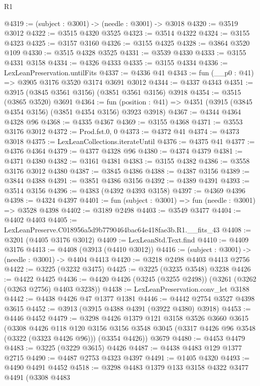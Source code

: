 \begin{lexlean}{R1}
\begin{coremodule}
@4319 := (subject : @3001) -> (needle : @3001) -> @3018
@4320 := @3519 @3012
@4322 := @3515 @4320 @3525
@4323 := @3514 @4322
@4324 := @3155 @4323
@4325 := @3157 @3160
@4326 := @3155 @4325
@4328 := @3864 @3520 @109
@4330 := @3515 @4328 @3525
@4331 := @3539 @4330
@4333 := @3155 @4331 @3158
@4334 := @4326 @4333
@4335 := @3155 @4334
@4336 := LexLeanPreservation.untilFits
@4337 := @4336 @41
@4343 := fun (__p0 : @41) => @3905 @3176 @3520 @3174 @3691 @3012
@4344 := @4337 @4343
@4351 := @3915 (@3845 @3561 @3156) (@3851 @3561 @3156) @3918
@4354 := @3515 (@3865 @3520) @3691
@4364 := fun (position : @41) => @4351 (@3915 (@3845 @4354 @3156) (@3851 @4354 @3156) @3923 @3918)
@4367 := @4344 @4364 @4328 @96
@4368 := @4335 @4367
@4369 := @3155 @4368
@4371 := @3553 @3176 @3012
@4372 := Prod.fst.{0, 0}
@4373 := @4372 @41
@4374 := @4373 @3018
@4375 := LexLeanCollections.iterateUntil
@4376 := @4375 @41
@4377 := @4376 @4364
@4379 := @4377 @4328 @96
@4380 := @4374 @4379
@4381 := @4371 @4380
@4382 := @3161 @4381
@4383 := @3155 @4382
@4386 := @3558 @3176 @3012 @4380
@4387 := @3845 @4386
@4388 := @4387 @3156
@4389 := @3844 @4388
@4391 := @3851 @4386 @3156
@4392 := @4389 @4391
@4393 := @3514 @3156
@4396 := @4383 (@4392 @4393 @3158)
@4397 := @4369 @4396
@4398 := @4324 @4397
@4401 := fun (subject : @3001) => fun (needle : @3001) => @3528 @4398
@4402 := @3189 @2498
@4403 := @3549 @3477
@4404 := @4402 @4403
@4405 := LexLeanPreserve.C018956a5d9b7790464bac64e418fae3b.R1.__fits_43
@4408 := @3201 (@4405 @3176 @3012)
@4409 := LexLeanStd.Text.find
@4410 := @4409 @3176
@4413 := @4408 (@3913 (@4410 @3012))
@4416 := (subject : @3001) -> (needle : @3001) -> @4404 @4413
@4420 := @3218 @2498 @4403 @4413 @2756
@4422 := @3225 (@3232 @3475)
@4425 := @3225 (@3235 @3548) @3238
@4426 := @4422 @4425
@4436 := @4420 @4426 (@3245 (@3255 @2498)) (@3261 (@3262 (@3263 @2756) @4403 @3238))
@4438 := LexLeanPreservation.conv_let @3188
@4442 := @4438 @4426 @47 @1377 @1381
@4446 := @4442 @2754 @3527 @4398 @3615
@4452 := @3913 (@3915 @4388 @4391 (@3922 @4380) @3918)
@4453 := @4446 @4452
@4479 := @3298
    @4426
    @1379
    @121
    @3158
    @3526
    @3660
    @3615
    (@3308
      @4426
      @118
      @120
      @3156
      @3156
      @3548
      @3045
      (@3317 @4426 @96 @3548 (@3322 (@3323 @4426 @96)))
      (@3354 @4426))
    @3679
@4480 := @4453 @4479
@4483 := @3225 (@3229 @3615) @4426
@4487 := @4438 @4483 @129 @1377 @2715
@4490 := @4487 @2753 @4323 @4397
@4491 := @1405 @4320
@4493 := @4490 @4491 @4452
@4518 := @3298
    @4483
    @1379
    @133
    @3158
    @4322
    @3477
    @4491
    (@3308
      @4483

\end{coremodule}
\end{lexlean}
